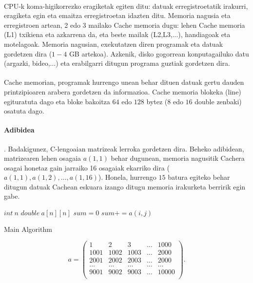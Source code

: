 \paragraph*{} CPU-k koma-higikorrezko eragiketak egiten ditu: datuak erregistroetatik irakurri, eragiketa egin eta emaitza erregistroetan idazten ditu. Memoria nagusia eta erregistroen artean, 2 edo 3 mailako Cache memoria dugu: lehen Cache memoria (L1) txikiena eta azkarrena da, eta beste mailak (L2,L3,...), handiagoak eta motelagoak. Memoria nagusian, exekutatzen diren programak eta datuak gordetzen dira ($1-4$ GB artekoa). Azkenik, disko gogorrean konputagailuko datu (argazki, bideo,...) eta erabilgarri ditugun programa guztiak gordetzen dira.  
   
\paragraph*{} Cache memorian, programak hurrengo unean behar dituen datuak gertu dauden printzipioaren arabera gordetzen da informazioa. Cache memoria blokeka (line) egituratuta dago eta bloke bakoitza $64$ edo $128$ bytez ($8$ edo $16$ double zenbaki) osatuta dago. 

\paragraph*{\textbf{Adibidea}}. Badakigunez, C-lengoaian matrizeak lerroka gordetzen dira. Beheko adibidean,  matrizearen lehen osagaia $a(1,1)$ behar dugunean, memoria nagusitik Cachera osagai honetaz gain jarraiko 16 osagaiak ekarriko dira ($a(1,1),a(1,2),\dots,a(1,16)$). Honela, hurrengo $15$ batura egiteko behar ditugun datuak Cachean eskuara izango ditugu memoria irakurketa berririk egin gabe. 

\begin{algorithm}[h]
 \BlankLine
  $int \ n$\;
  $double \ a[n][n]$\;
  \BlankLine
  $sum=0$\;
  {
   \BlankLine
   {
    \BlankLine 
    $sum+=a(i,j)$\;
   }
 }
 \caption{Main Algorithm}
\end{algorithm} 

\begin{equation*}
a=\left(\begin{array}{ccccc}
  1    & 2    & 3    & \dots & 1000 \\
  1001 & 1002 & 1003 &\dots & 2000 \\
  2001 & 2002 & 2003 &\dots & 2000 \\
  \dots & \dots & \dots & \dots & \dots \\
  9001 & 9002 & 9003 &\dots & 10000 \\
  \end{array}\right).  
\end{equation*}


